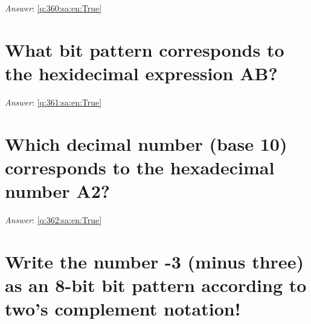 \documentclass[a4paper,11pt,oneside]{book}
\begin{document}
\begin{sloppypar}
\label{q:360:sa:en:False}

\vspace{2cm}

\noindent\makebox[\textwidth]{\hrulefill}

\vspace{1cm}

\textit{Answer}: \autoref{q:360:sa:en:True}



\section{What bit pattern corresponds to the hexidecimal expression AB?}

\label{q:361:sa:en:False}

\vspace{2cm}

\noindent\makebox[\textwidth]{\hrulefill}

\vspace{1cm}

\textit{Answer}: \autoref{q:361:sa:en:True}



\section{Which decimal number (base 10) corresponds to the hexadecimal number  A2?}

\label{q:362:sa:en:False}

\vspace{2cm}

\noindent\makebox[\textwidth]{\hrulefill}

\vspace{1cm}

\textit{Answer}: \autoref{q:362:sa:en:True}



\section{Write the number -3 (minus three) as an 8-bit bit pattern according to two's complement notation!}

\label{q:363:sa:en:False}

\vspace{2cm}

\noindent\makebox[\textwidth]{\hrulefill}

\vspace{1cm}


\end{sloppypar}
\end{document}
